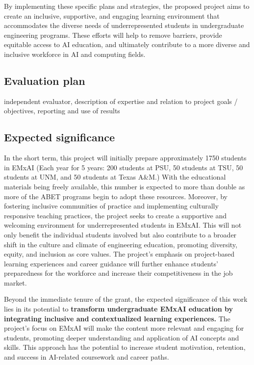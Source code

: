 \documentclass[11pt]{article}
\begin{document}
By implementing these specific plans and strategies, the proposed project aims to create an inclusive, supportive, and engaging learning environment that accommodates the diverse needs of underrepresented students in undergraduate engineering programs. These efforts will help to remove barriers, provide equitable access to AI education, and ultimately contribute to a more diverse and inclusive workforce in AI and computing fields.

\subsection{Evaluation plan}
independent evaluator, description of expertise and relation to project goals / objectives, reporting and use of results

\subsection{Expected significance}

In the short term, this project will initially prepare approximately 1750 students in EMxAI (Each year for 5 years: 200 students at PSU, 50 students at TSU, 50 students at UNM, and 50 students at Texas A\&M.) 
With the educational materials being freely available, this number is expected to more than double as more of the ABET programs begin to adopt these resources. 
Moreover, by fostering inclusive communities of practice and implementing culturally responsive teaching practices, the project seeks to create a supportive and welcoming environment for underrepresented students in EMxAI. This will not only benefit the individual students involved but also contribute to a broader shift in the culture and climate of engineering education, promoting diversity, equity, and inclusion as core values. The project's emphasis on project-based learning experiences and career guidance will further enhance students' preparedness for the workforce and increase their competitiveness in the job market.

Beyond the immediate tenure of the grant, the expected significance of this work lies in its potential to \textbf{transform undergraduate EMxAI education by integrating inclusive and contextualized learning experiences.}
The project's focus on EMxAI will make the content more relevant and engaging for students, promoting deeper understanding and application of AI concepts and skills. This approach has the potential to increase student motivation, retention, and success in AI-related coursework and career paths.
\end{document}
